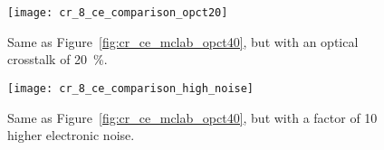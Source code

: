 \begin{figure}
  \texttt{[image: cr\_8\_ce\_comparison\_opct20]}
  \caption[\textit{Charge Resolution} comparison between Cross Correlation and Window Integration for \textit{MCLab} data with an optical crosstalk of \SI{20}{\percent}.]{Same as Figure~\ref{fig:cr_ce_mclab_opct40}, but with an optical crosstalk of \SI{20}{\percent}.}
  \label{fig:cr_ce_mclab_opct20}
\end{figure}

\begin{figure}
  \texttt{[image: cr\_8\_ce\_comparison\_high\_noise]}
  \caption[\textit{Charge Resolution} comparison between Cross Correlation and Window Integration for \textit{MCLab} data with a high amount of electronic noise.]{Same as Figure~\ref{fig:cr_ce_mclab_opct40}, but with a factor of 10 higher electronic noise.}
  \label{fig:cr_ce_mclab_opct20}
\end{figure}








